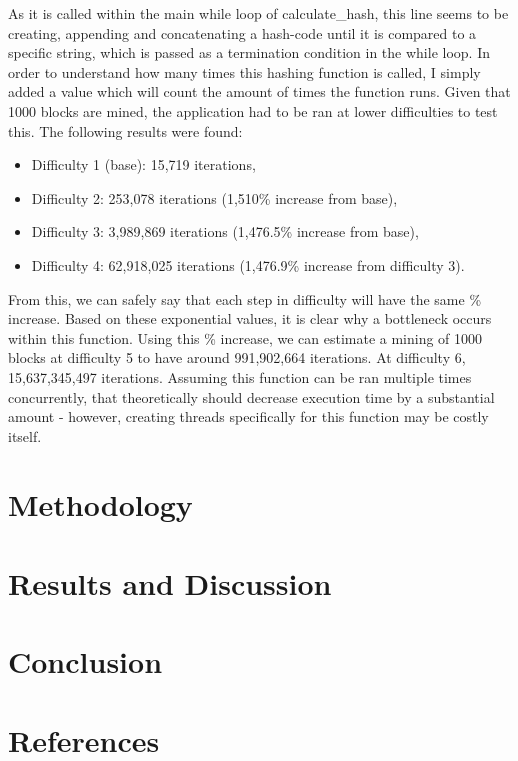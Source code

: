 \documentclass[12pt, a4paper]{article}
\begin{document}
As it is called within the main while loop of calculate\_hash, this line seems to be creating, appending and concatenating a hash-code until it is compared to a specific string, which is passed as a termination condition in the while loop. In order to understand how many times this hashing function is called, I simply added a value which will count the amount of times the function runs. Given that 1000 blocks are mined, the application had to be ran at lower difficulties to test this. The following results were found:
\begin{itemize}
\item Difficulty 1 (base): 15,719 iterations,
\item Difficulty 2: 253,078 iterations (1,510\% increase from base),
\item Difficulty 3: 3,989,869 iterations (1,476.5\% increase from base),
\item Difficulty 4: 62,918,025 iterations (1,476.9\% increase from difficulty 3).
\end{itemize}
From this, we can safely say that each step in difficulty will have the same \% increase. Based on these exponential values, it is clear why a bottleneck occurs within this function. Using this \% increase, we can estimate a mining of 1000 blocks at difficulty 5 to have around 991,902,664 iterations. At difficulty 6, 15,637,345,497 iterations. Assuming this function can be ran multiple times concurrently, that theoretically should decrease execution time by a substantial amount - however, creating threads specifically for this function may be costly itself.

\section{Methodology}

\section{Results and Discussion}

\section{Conclusion}

\section{References}
\end{document}
